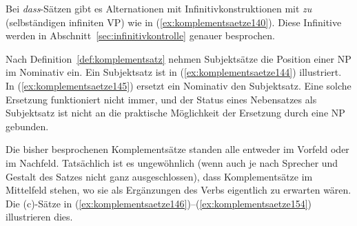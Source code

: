 Bei \textit{dass}-Sätzen gibt es Alternationen mit Infinitivkonstruktionen mit \textit{zu} (selbständigen infiniten VP) wie in (\ref{ex:komplementsaetze140}).
Diese Infinitive werden in Abschnitt~\ref{sec:infinitivkontrolle} genauer besprochen.

\begin{exe}
  \ex\label{ex:komplementsaetze140}
  \begin{xlist}
  \end{xlist}
\end{exe}

Nach Definition~\ref{def:komplementsatz} nehmen Subjektsätze die Position einer NP im Nominativ ein.
Ein Subjektsatz ist in (\ref{ex:komplementsaetze144}) illustriert.
In (\ref{ex:komplementsaetze145}) ersetzt ein Nominativ den Subjektsatz.
Eine solche Ersetzung funktioniert nicht immer, und der Status eines Nebensatzes als Subjektsatz ist nicht an die praktische Möglichkeit der Ersetzung durch eine NP gebunden.

\Enl

\begin{exe}
  \ex\label{ex:komplementsaetze143}
  \begin{xlist}
  \end{xlist}
\end{exe}

Die bisher besprochenen Komplementsätze standen alle entweder im Vorfeld oder im Nachfeld.
Tatsächlich ist es ungewöhnlich (wenn auch je nach Sprecher und Gestalt des Satzes nicht ganz ausgeschlossen), dass Komplementsätze im Mittelfeld stehen, wo sie als Ergänzungen des Verbs eigentlich zu erwarten wären.
Die (c)-Sätze in (\ref{ex:komplementsaetze146})--(\ref{ex:komplementsaetze154}) illustrieren dies.

